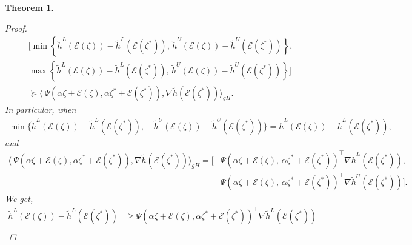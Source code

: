 \documentclass[12pt, reqno]{amsart}
\newtheorem{theorem}{Theorem}[section]
\theoremstyle{definition}
\theoremstyle{remark}
\numberwithin{equation}{section}
\begin{document}
\begin{theorem}
\begin{proof}
   \begin{equation*}
       \begin{aligned}
           &[\min \left\{
    \tilde{h}^L(\mathcal{E}(\zeta)) - \tilde{h}^L(\mathcal{E}(\zeta^*)),\,
    \tilde{h}^U(\mathcal{E}(\zeta)) - \tilde{h}^U(\mathcal{E}(\zeta^*))
\right\}, \\
&\max \left\{
    \tilde{h}^L(\mathcal{E}(\zeta)) - \tilde{h}^L(\mathcal{E}(\zeta^*)),\,
    \tilde{h}^U(\mathcal{E}(\zeta)) - \tilde{h}^U(\mathcal{E}(\zeta^*))
\right\}]\\
&\succeq  \langle\ {\Psi}( {\alpha} \mathit{\zeta} + \mathcal{\mathcal{E}}(\mathit{\zeta} ), {\alpha}\mathit{\zeta^*} + \mathcal{\mathcal{E}}(\mathit{\zeta^*} )),\nabla  \tilde{h}( \mathcal{\mathcal{E}}(\mathit{\zeta^*} ))\rangle_{gH}.
       \end{aligned}
   \end{equation*}
 In particular, when
   \begin{equation*}
    \begin{aligned}
        \min\{\tilde{h}^L(\mathcal{E}(\zeta)) - \tilde{h}^L(\mathcal{E}(\zeta^*)),~& \tilde{h}^U(\mathcal{E}(\zeta)) - \tilde{h}^U(\mathcal{E}(\zeta^*))\} = \tilde{h}^L(\mathcal{E}(\zeta)) - \tilde{h}^L(\mathcal{E}(\zeta^*)),
\end{aligned}
\end{equation*}
and
\begin{equation*}
\begin{aligned}
    \langle\ {\Psi}( {\alpha} \mathit{\zeta} + \mathcal{\mathcal{E}}(\mathit{\zeta} ), {\alpha}\mathit{\zeta^*} + \mathcal{\mathcal{E}}(\mathit{\zeta^*} )),\nabla  \tilde{h}( \mathcal{\mathcal{E}}(\mathit{\zeta^*} ))\rangle_{gH}
    = \big[
    &\Psi(\alpha \mathit{\zeta}  + \mathcal{\mathcal{E}}(\mathit{\zeta} ),\, \alpha \mathit{\zeta^*}  + \mathcal{\mathcal{E}}(\mathit{\zeta^*} ))^{\!\top}
    \nabla \tilde{h}^L(\mathcal{\mathcal{E}}(\mathit{\zeta^*} )), \\
    &\Psi(\alpha \mathit{\zeta}  + \mathcal{\mathcal{E}}(\mathit{\zeta} ),\, \alpha \mathit{\zeta^*}  + \mathcal{\mathcal{E}}(\mathit{\zeta^*} ))^{\!\top}
    \nabla \tilde{h}^U(\mathcal{\mathcal{E}}(\mathit{\zeta^*} )) 
    \big].
\end{aligned}
\end{equation*}
We get,
\begin{align*}
           \tilde{h}^L(\mathcal{\mathcal{E}}(\mathit{\zeta} )) - \tilde{h}^L(\mathcal{\mathcal{E}}(\mathit{\zeta} ^*)) 
&\geq \Psi(\alpha \mathit{\zeta} +\mathcal{\mathcal{E}}(\mathit{\zeta} ), \alpha \mathit{\zeta} ^*+\mathcal{\mathcal{E}}(\mathit{\zeta} ^*))^{\!\top}\nabla\tilde{h}^L(\mathcal{\mathcal{E}}(\mathit{\zeta} ^*)) \\

\end{align*}
\end{proof}
\end{theorem}
\end{document}
